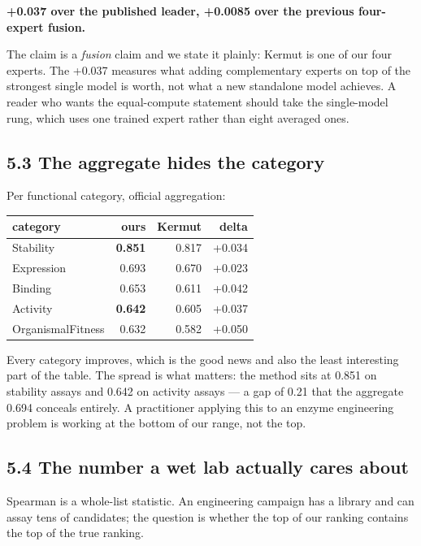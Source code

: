 \textbf{+0.037 over the published leader, +0.0085 over the previous four-expert fusion.}

The claim is a \emph{fusion} claim and we state it plainly: Kermut is one of our four experts. The +0.037
measures what adding complementary experts on top of the strongest single model is worth, not what a new
standalone model achieves. A reader who wants the equal-compute statement should take the single-model
rung, which uses one trained expert rather than eight averaged ones.

\hypertarget{the-aggregate-hides-the-category}{%
\subsection{5.3 The aggregate hides the category}\label{the-aggregate-hides-the-category}}

Per functional category, official aggregation:

\begin{longtable}[]{@{}lrrr@{}}
\toprule
category & ours & Kermut & delta \\
\midrule
\endhead
Stability & \textbf{0.851} & 0.817 & +0.034 \\
Expression & 0.693 & 0.670 & +0.023 \\
Binding & 0.653 & 0.611 & +0.042 \\
Activity & \textbf{0.642} & 0.605 & +0.037 \\
OrganismalFitness & 0.632 & 0.582 & +0.050 \\
\bottomrule
\end{longtable}

Every category improves, which is the good news and also the least interesting part of the table. The
spread is what matters: the method sits at 0.851 on stability assays and 0.642 on activity assays --- a
gap of 0.21 that the aggregate 0.694 conceals entirely. A practitioner applying this to an enzyme
engineering problem is working at the bottom of our range, not the top.

\hypertarget{the-number-a-wet-lab-actually-cares-about}{%
\subsection{5.4 The number a wet lab actually cares about}\label{the-number-a-wet-lab-actually-cares-about}}

Spearman is a whole-list statistic. An engineering campaign has a library and can assay tens of
candidates; the question is whether the top of our ranking contains the top of the true ranking.

